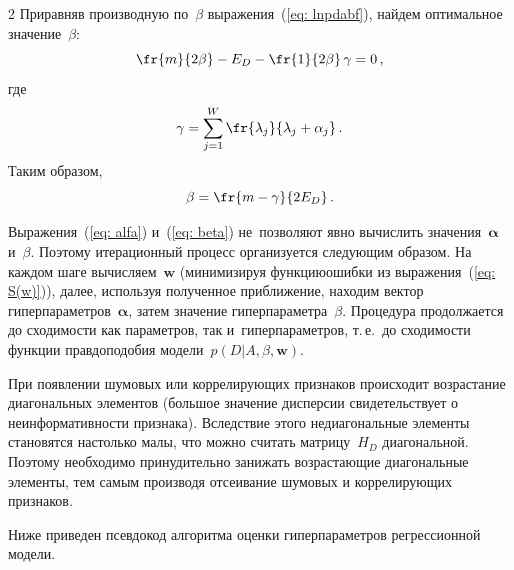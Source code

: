 \begin{multicols}{2}
Приравняв производную по~$\beta$ выражения~(\ref{eq: lnpdabf}), найдем оптимальное 
значение~$\beta$:
$$
\fr{m}{2\beta}-E_D-\fr{1}{2\beta}\,\gamma=0\,,
$$
где
$$
\gamma=\sum\limits_{j=1}^W \fr{\lambda_j}{\lambda_j + \alpha_j}\,.
$$
Таким образом,
\begin{equation}
\label {eq: beta}
\beta=\fr{m-\gamma}{2E_D}\,.
\end{equation}

Выражения~(\ref{eq: alfa}) и~(\ref{eq: beta}) не~позволяют явно вы\-чис\-лить 
значения~$\boldsymbol{\alpha}$ и~$\beta$. Поэтому итерационный процесс 
организуется следующим образом. На каж\-дом шаге вычисляем~$\mathbf{w}$ 
(минимизируя функцию\linebreak ошибки из выражения~(\ref{eq: S(w)})), далее, 
используя полученное приближение, находим вектор гиперпараметров~$\boldsymbol{\alpha}$, 
затем значение гиперпараметра~$\beta$. \mbox{Процедура} продолжается до сходимости как па\-ра\-мет\-ров, 
так и~гиперпараметров, т.\,е.\ до сходимости функции правдоподобия 
модели~$p(D|A,\beta,\mathbf{w})$.

При появлении шумовых или коррелирующих признаков происходит возрастание диагональных 
элементов (большое значение дисперсии свидетельствует о неинформативности признака). 
Вследствие этого недиагональные элементы становятся настолько малы, что можно считать 
матрицу~$H_D$ диагональной. Поэтому необходимо принудительно занижать возрастающие 
диагональные элементы, тем самым производя отсеивание шумовых и коррелирующих признаков.

Ниже приведен псевдокод алгоритма оценки гиперпараметров регрессионной модели.


\end{multicols}

